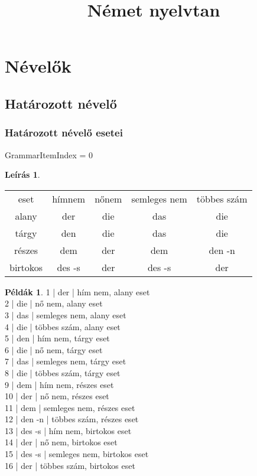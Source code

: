 \documentclass{article}
\title{Német nyelvtan}
\theoremstyle{definition}
\newtheorem*{exmp}{Példák}
\newtheorem*{desc}{Leírás}
\begin{document}
\maketitle

\tableofcontents

\section{Névelők}

\subsection{Határozott névelő}

\subsubsection{Határozott névelő esetei}

GrammarItemIndex = 0

\begin{desc}
\begin{tabular}{ccccc}
eset & hímnem & nőnem & semleges nem & többes szám\\
alany & der & die & das & die\\
tárgy & den & die & das & die\\
részes & dem & der & dem & den -n\\
birtokos & des -s & der & des -s & der\\
\end{tabular}
\end{desc}

\begin{exmp}
1 | der | hím nem, alany eset\\
2 | die | nő nem, alany eset\\
3 | das | semleges nem, alany eset\\
4 | die | többes szám, alany eset\\
5 | den | hím nem, tárgy eset\\
6 | die | nő nem, tárgy eset\\
7 | das | semleges nem, tárgy eset\\
8 | die | többes szám, tárgy eset\\
9 | dem | hím nem, részes eset\\
10 | der | nő nem, részes eset\\
11 | dem | semleges nem, részes eset\\
12 | den -n | többes szám, részes eset\\
13 | des -s | hím nem, birtokos eset\\
14 | der | nő nem, birtokos eset\\
15 | des -s | semleges nem, birtokos eset\\
16 | der | többes szám, birtokos eset\\
\end{exmp}
\end{document}
